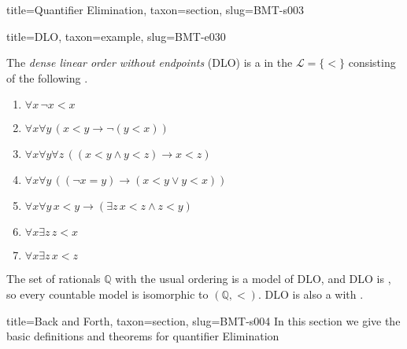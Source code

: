 \documentclass[a4paper]{article}
\begin{document}
\begin{tree}{title={Quantifier Elimination}, taxon={section}, slug={BMT-s003}}
  
  
\begin{tree}{title={DLO}, taxon={example}, slug={BMT-e030}}

    The \emph{dense linear order without endpoints} (DLO) is a  in the  \(\mathcal  L= \{ < \}\)
    consisting of the following .
    \begin{enumerate}
\item{\(\forall  x \, \neg  x<x\)}
        \item{\(\forall  x \forall  y \, (x<y \rightarrow \neg (y<x))\)}
        \item{\(\forall  x \forall  y \forall  z \, ((x<y \land  y<z) \rightarrow  x<z)\)}
        \item{\(\forall  x \forall  y \, (( \neg  x=y) \rightarrow (x<y \lor  y<x))\)}
        \item{\(\forall  x \forall  y \, x<y \rightarrow ( \exists  z \, x<z \land  z<y)\)}
        \item{\(\forall  x \exists  z \, z<x\)}
        \item{\(\forall  x \exists  z \, x<z\)}
\end{enumerate}\par{
    The set of rationals \(\mathbb  Q\) with the usual ordering is a model of DLO, and DLO is ,
    so every countable model is isomorphic to \(( \mathbb  Q,<)\). DLO is also a  with
    .
}
\end{tree}


\end{tree}


  
  
\begin{tree}{title={Back and Forth}, taxon={section}, slug={BMT-s004}}
In this section we give the basic definitions and theorems for quantifier Elimination
\end{tree}


  
  
\end{document}
